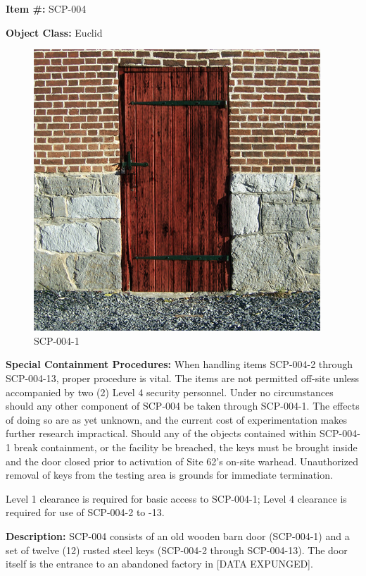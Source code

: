 \textbf{Item \#:} SCP-004

\textbf{Object Class:} Euclid

\begin{figure}[h]
\begin{center}
\includegraphics[scale=1.6]{scp/004.jpg}
\linebreak SCP-004-1
\end{center}
\end{figure}

\textbf{Special Containment Procedures:} When handling items SCP-004-2 through SCP-004-13, proper procedure is vital. The items are not permitted off-site unless accompanied by two (2) Level 4 security personnel. Under no circumstances should any other component of SCP-004 be taken through SCP-004-1. The effects of doing so are as yet unknown, and the current cost of experimentation makes further research impractical. Should any of the objects contained within SCP-004-1 break containment, or the facility be breached, the keys must be brought inside and the door closed prior to activation of Site 62’s on-site warhead. Unauthorized removal of keys from the testing area is grounds for immediate termination.

Level 1 clearance is required for basic access to SCP-004-1; Level 4 clearance is required for use of SCP-004-2 to -13.

\textbf{Description:} SCP-004 consists of an old wooden barn door (SCP-004-1) and a set of twelve (12) rusted steel keys (SCP-004-2 through SCP-004-13). The door itself is the entrance to an abandoned factory in [DATA EXPUNGED].
\newpage

